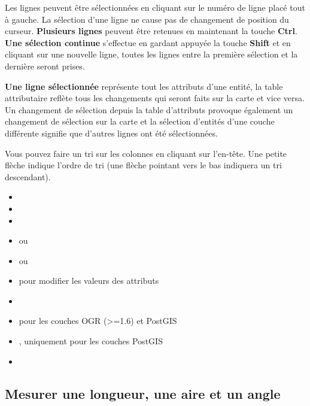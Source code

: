 Les lignes peuvent être sélectionnées en cliquant sur le numéro de ligne placé tout à gauche. La sélection d'une ligne ne cause pas de changement de position du curseur. \textbf{Plusieurs lignes} peuvent être retenues en maintenant la touche \textbf{Ctrl}. \textbf{Une sélection continue} s'effectue en gardant appuyée la touche \textbf{Shift} et en cliquant sur une nouvelle ligne, toutes les lignes entre la première sélection et la dernière seront prises.

\textbf{Une ligne sélectionnée} représente tout les attributs d'une entité, la table attributaire reflète tous les changements qui seront faits sur la carte et vice versa. Un changement de sélection depuis la table d'attributs provoque également un changement de sélection sur la carte et la sélection d'entités d'une couche différente signifie que d'autres lignes ont été sélectionnées.

Vous pouvez faire un tri sur les colonnes en cliquant sur l'en-tête. Une petite flèche indique l'ordre de tri (une flèche pointant vers le bas indiquera un tri descendant).

\begin{itemize}[label=--]
\item {}
\item {}
\item {}
\item {} ou 
\item {} ou 
\item {} pour modifier les valeurs des attributs
\item {}
\item {} pour les couches OGR (>=1.6) et PostGIS
\item {}, uniquement pour les couches PostGIS
\item {}
\end{itemize}
               
\subsection{Mesurer une longueur, une aire et un angle}

